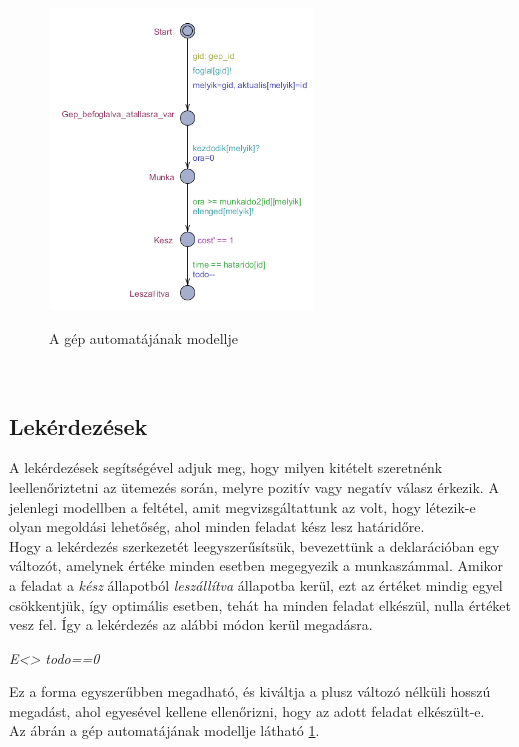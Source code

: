 \documentclass [12pt]{report}
\begin{document}
    \begin{figure}[htpb]
        \begin{center}
        \label{tab:gepautomat}
       \includegraphics[height=8cm]{Feladat}\\
        \caption{A gép automatájának modellje}
        \end{center}
        \end{figure}
    \\    
   
    \subsection{Lekérdezések}
    A lekérdezések segítségével adjuk meg, hogy milyen kitételt szeretnénk leellenőriztetni az ütemezés során, melyre pozitív vagy negatív válasz érkezik. A jelenlegi modellben a feltétel, amit megvizsgáltattunk az volt, hogy létezik-e olyan megoldási lehetőség, ahol minden feladat kész lesz határidőre.\\
    Hogy a lekérdezés szerkezetét leegyszerűsítsük, bevezettünk a deklarációban egy változót, amelynek értéke minden esetben megegyezik a munkaszámmal. Amikor a feladat a \emph{kész} állapotból \emph{leszállítva} állapotba kerül, ezt az értéket mindig egyel csökkentjük, így optimális esetben, tehát ha minden feladat elkészül, nulla értéket vesz fel. Így a lekérdezés az alábbi módon kerül megadásra.
    \begin{center}
	\emph{E<> todo==0}
    \end{center}
    Ez a forma egyszerűbben megadható, és kiváltja a plusz változó nélküli hosszú megadást, ahol egyesével kellene ellenőrizni, hogy az adott feladat elkészült-e. \\
    Az ábrán a gép automatájának modellje látható \ref{tab:gepautomat}.
    
\end{document}
